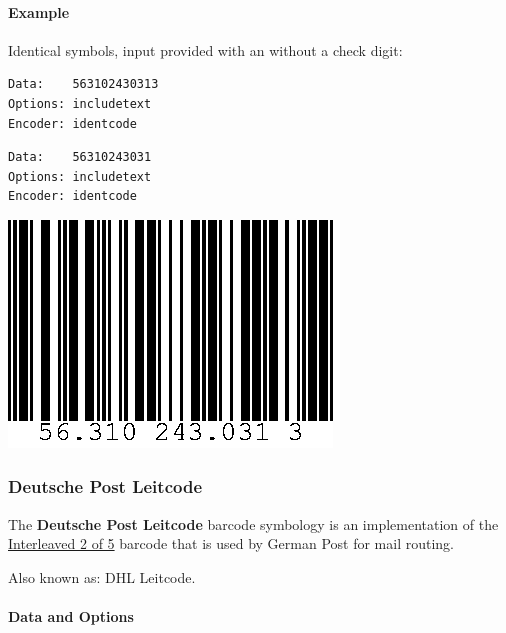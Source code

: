 \hypertarget{example-8}{%
\paragraph{Example}\label{example-8}}

Identical symbols, input provided with an without a check digit:

\begin{verbatim}
Data:    563102430313
Options: includetext
Encoder: identcode
\end{verbatim}

\begin{verbatim}
Data:    56310243031
Options: includetext
Encoder: identcode
\end{verbatim}

\includegraphics{images/identcode-1.eps}

\hypertarget{deutsche-post-leitcode}{%
\subsubsection{Deutsche Post Leitcode}\label{deutsche-post-leitcode}}

The \textbf{Deutsche Post Leitcode} barcode symbology is an
implementation of the \protect\hyperlink{interleaved-2-of-5}{Interleaved
2 of 5} barcode that is used by German Post for mail routing.

Also known as: DHL Leitcode.

\hypertarget{data-and-options-44}{%
\paragraph{Data and Options}\label{data-and-options-44}}

